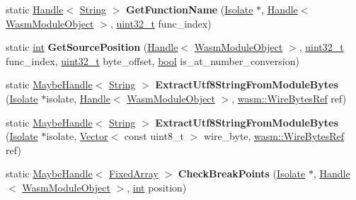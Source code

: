 \begin{DoxyCompactItemize}
static \mbox{\hyperlink{classv8_1_1internal_1_1Handle}{Handle}}$<$ \mbox{\hyperlink{classv8_1_1internal_1_1String}{String}} $>$ {\bfseries Get\+Function\+Name} (\mbox{\hyperlink{classv8_1_1internal_1_1Isolate}{Isolate}} $\ast$, \mbox{\hyperlink{classv8_1_1internal_1_1Handle}{Handle}}$<$ \mbox{\hyperlink{classv8_1_1internal_1_1WasmModuleObject}{Wasm\+Module\+Object}} $>$, \mbox{\hyperlink{classuint32__t}{uint32\+\_\+t}} func\+\_\+index)
\item 
\mbox{\label{classv8_1_1internal_1_1WasmModuleObject_a00c78f0419428b4526d850633361f529}} 
static \mbox{\hyperlink{classint}{int}} {\bfseries Get\+Source\+Position} (\mbox{\hyperlink{classv8_1_1internal_1_1Handle}{Handle}}$<$ \mbox{\hyperlink{classv8_1_1internal_1_1WasmModuleObject}{Wasm\+Module\+Object}} $>$, \mbox{\hyperlink{classuint32__t}{uint32\+\_\+t}} func\+\_\+index, \mbox{\hyperlink{classuint32__t}{uint32\+\_\+t}} byte\+\_\+offset, \mbox{\hyperlink{classbool}{bool}} is\+\_\+at\+\_\+number\+\_\+conversion)
\item 
\mbox{\label{classv8_1_1internal_1_1WasmModuleObject_a3645cb06c2f3ba8898703f22ced53a19}} 
static \mbox{\hyperlink{classv8_1_1internal_1_1MaybeHandle}{Maybe\+Handle}}$<$ \mbox{\hyperlink{classv8_1_1internal_1_1String}{String}} $>$ {\bfseries Extract\+Utf8\+String\+From\+Module\+Bytes} (\mbox{\hyperlink{classv8_1_1internal_1_1Isolate}{Isolate}} $\ast$isolate, \mbox{\hyperlink{classv8_1_1internal_1_1Handle}{Handle}}$<$ \mbox{\hyperlink{classv8_1_1internal_1_1WasmModuleObject}{Wasm\+Module\+Object}} $>$, \mbox{\hyperlink{classv8_1_1internal_1_1wasm_1_1WireBytesRef}{wasm\+::\+Wire\+Bytes\+Ref}} ref)
\item 
\mbox{\label{classv8_1_1internal_1_1WasmModuleObject_aeb89fb2603af25ba7afeb73ae678cd2c}} 
static \mbox{\hyperlink{classv8_1_1internal_1_1MaybeHandle}{Maybe\+Handle}}$<$ \mbox{\hyperlink{classv8_1_1internal_1_1String}{String}} $>$ {\bfseries Extract\+Utf8\+String\+From\+Module\+Bytes} (\mbox{\hyperlink{classv8_1_1internal_1_1Isolate}{Isolate}} $\ast$isolate, \mbox{\hyperlink{classv8_1_1internal_1_1Vector}{Vector}}$<$ const uint8\+\_\+t $>$ wire\+\_\+byte, \mbox{\hyperlink{classv8_1_1internal_1_1wasm_1_1WireBytesRef}{wasm\+::\+Wire\+Bytes\+Ref}} ref)
\item 
\mbox{\label{classv8_1_1internal_1_1WasmModuleObject_a7cf9c98788b3f5035b982dcb07dc872f}} 
static \mbox{\hyperlink{classv8_1_1internal_1_1MaybeHandle}{Maybe\+Handle}}$<$ \mbox{\hyperlink{classv8_1_1internal_1_1FixedArray}{Fixed\+Array}} $>$ {\bfseries Check\+Break\+Points} (\mbox{\hyperlink{classv8_1_1internal_1_1Isolate}{Isolate}} $\ast$, \mbox{\hyperlink{classv8_1_1internal_1_1Handle}{Handle}}$<$ \mbox{\hyperlink{classv8_1_1internal_1_1WasmModuleObject}{Wasm\+Module\+Object}} $>$, \mbox{\hyperlink{classint}{int}} position)
\end{DoxyCompactItemize}
